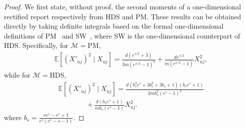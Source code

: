 \documentclass[conference,compsoc]{IEEEtran}
\theoremstyle{boldplain}
\theoremstyle{bolddefinition}
\theoremstyle{remark}
\newcommand{\pmm}{PM\xspace}
\newcommand{\hdsm}{HDS\xspace}
\newcommand{\swm}{SW\xspace}
\begin{document}
{\begin{proof}
We first state, without proof, the second moments of a one-dimensional rectified report respectively from \hdsm and \pmm. These results can be obtained directly by taking definite integrals based on the formal one-dimensional definitions of \pmm~\cite{wang2019ldpmultidim} and \swm~\cite{li2020estimating}, where \swm is the one-dimensional counterpart of \hdsm. Specifically, for $\mathcal{M}=\mathrm{PM}$,
$$
\begin{aligned}
&\mathbb{E}[(X'_{uj})^2\mid X_{uj}]
=
\frac{d(e^{s/2}+3)}
{3m(e^{s/2}-1)^2}
+
\frac{d e^{s/2}}
{m(e^{s/2}-1)}
X_{uj}^2,
\end{aligned}
$$
while for $\mathcal{M}=\mathrm{HDS}$,
$$
\begin{aligned}
&\mathbb{E}[(X'_{uj})^2\mid X_{uj}]
=
\frac{
d(b_s^3e^s+3b_s^2+3b_s+1)(b_s e^s+1)
}{
3m b_s^2(e^s-1)^2
}
\\
&\qquad\qquad
+
\frac{
d(b_s e^s+1)
}{
m b_s(e^s-1)
}
X_{uj}^2.
\end{aligned}
$$
where
$b_s=\frac{s e^s-e^s+1}{e^s(e^s-s-1)}$.


\end{proof}}
\end{document}
